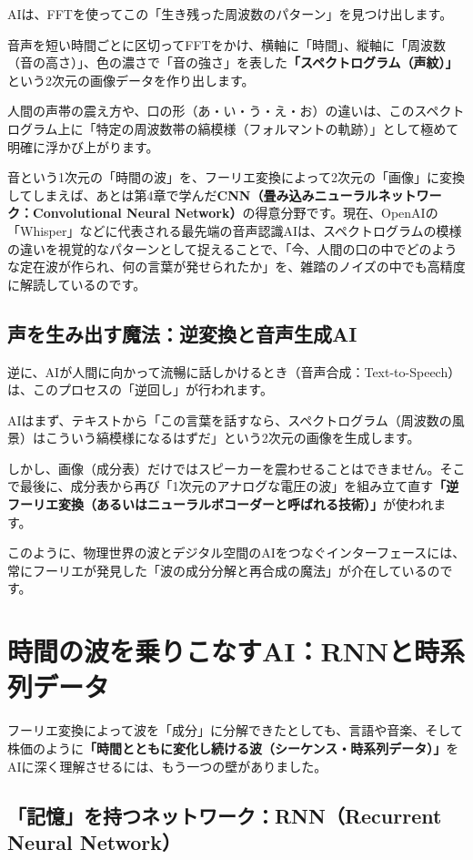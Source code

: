 AIは、FFTを使ってこの「生き残った周波数のパターン」を見つけ出します。

音声を短い時間ごとに区切ってFFTをかけ、横軸に「時間」、縦軸に「周波数（音の高さ）」、色の濃さで「音の強さ」を表した\textbf{「スペクトログラム（声紋）」}という2次元の画像データを作り出します。

人間の声帯の震え方や、口の形（あ・い・う・え・お）の違いは、このスペクトログラム上に「特定の周波数帯の縞模様（フォルマントの軌跡）」として極めて明確に浮かび上がります。

音という1次元の「時間の波」を、フーリエ変換によって2次元の「画像」に変換してしまえば、あとは第4章で学んだ\textbf{CNN（畳み込みニューラルネットワーク：Convolutional Neural Network）}の得意分野です。現在、OpenAIの「Whisper」などに代表される最先端の音声認識AIは、スペクトログラムの模様の違いを視覚的なパターンとして捉えることで、「今、人間の口の中でどのような定在波が作られ、何の言葉が発せられたか」を、雑踏のノイズの中でも高精度に解読しているのです。

\subsection{声を生み出す魔法：逆変換と音声生成AI}

逆に、AIが人間に向かって流暢に話しかけるとき（音声合成：Text-to-Speech）は、このプロセスの「逆回し」が行われます。

AIはまず、テキストから「この言葉を話すなら、スペクトログラム（周波数の風景）はこういう縞模様になるはずだ」という2次元の画像を生成します。

しかし、画像（成分表）だけではスピーカーを震わせることはできません。そこで最後に、成分表から再び「1次元のアナログな電圧の波」を組み立て直す\textbf{「逆フーリエ変換（あるいはニューラルボコーダーと呼ばれる技術）」}が使われます。

このように、物理世界の波とデジタル空間のAIをつなぐインターフェースには、常にフーリエが発見した「波の成分分解と再合成の魔法」が介在しているのです。

\section{時間の波を乗りこなすAI：RNNと時系列データ}

フーリエ変換によって波を「成分」に分解できたとしても、言語や音楽、そして株価のように\textbf{「時間とともに変化し続ける波（シーケンス・時系列データ）」}をAIに深く理解させるには、もう一つの壁がありました。

\subsection{「記憶」を持つネットワーク：RNN（Recurrent Neural Network）}

